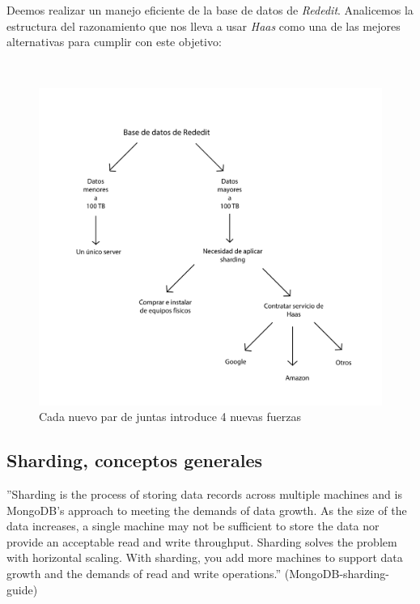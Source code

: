 Deemos realizar un manejo eficiente de la base de datos de \emph{Rededit}. Analicemos la estructura del razonamiento que 
nos lleva a usar \emph{Haas} como una de las mejores alternativas para cumplir con este objetivo:

~

\begin{figure}[!h]
	\begin{center}
		  \includegraphics[keepaspectratio]{imagenes/im_1.pdf}
		  \caption{Cada nuevo par de juntas introduce 4 nuevas fuerzas}
		  \label{fig:contra1}
	\end{center}
\end{figure}
\FloatBarrier

\subsection{Sharding, conceptos generales}

''Sharding is the process of storing data records across multiple machines and is MongoDB’s approach to meeting the
demands of data growth. As the size of the data increases, a single machine may not be sufficient to store the data nor
provide an acceptable read and write throughput. Sharding solves the problem with horizontal scaling. With sharding,
you add more machines to support data growth and the demands of read and write operations.'' (MongoDB-sharding-guide)

